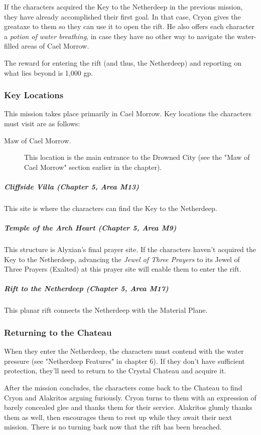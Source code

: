 \documentclass[10pt,a4paper,twoside,bg=print,twocolumn,openany,nodeprecatedcode]{dndbook}
\begin{document}
If the characters acquired the Key to the Netherdeep in the previous mission, they have already accomplished their first goal. In that case, Cryon gives the greataxe to them so they can use it to open the rift. He also offers each character a \textit{potion of water breathing}, in case they have no other way to navigate the water-filled areas of Cael Morrow.

The reward for entering the rift (and thus, the Netherdeep) and reporting on what lies beyond is 1,000 gp.

\subsubsection{Key Locations}
This mission takes place primarily in Cael Morrow. Key locations the characters must visit are as follows:


\begin{description}
\item[Maw of Cael Morrow.]
This location is the main entrance to the Drowned City (see the "Maw of Cael Morrow" section earlier in the chapter).
\end{description}

\subparagraph{Cliffside Villa (Chapter 5, Area M13)}
This site is where the characters can find the Key to the Netherdeep.

\subparagraph{Temple of the Arch Heart (Chapter 5, Area M9)}
This structure is Alyxian's final prayer site. If the characters haven't acquired the Key to the Netherdeep, advancing the \textit{Jewel of Three Prayers} to its Jewel of Three Prayers (Exalted) at this prayer site will enable them to enter the rift.

\subparagraph{Rift to the Netherdeep (Chapter 5, Area M17)}
This planar rift connects the Netherdeep with the Material Plane.

\subsubsection{Returning to the Chateau}
When they enter the Netherdeep, the characters must contend with the water pressure (see "Netherdeep Features" in chapter 6). If they don't have sufficient protection, they'll need to return to the Crystal Chateau and acquire it.

After the mission concludes, the characters come back to the Chateau to find Cryon and Alakritos arguing furiously. Cryon turns to them with an expression of barely concealed glee and thanks them for their service. Alakritos glumly thanks them as well, then encourages them to rest up while they await their next mission. There is no turning back now that the rift has been breached.
\end{document}

